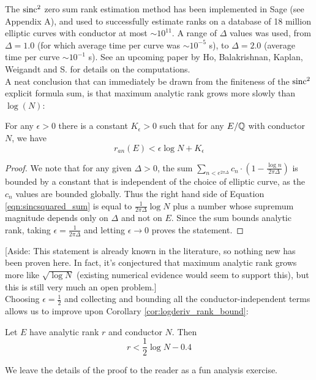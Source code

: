 The $\text{sinc}^2$ zero sum rank estimation method has been implemented in Sage (see Appendix A), and used to successfully estimate ranks on a database of 18 million elliptic curves with conductor at most $\sim 10^{11}$. A range of $\Delta$ values was used, from $\Delta=1.0$ (for which average time per curve was $\sim 10^{-5}$ s), to $\Delta=2.0$ (average time per curve $\sim 10^{-1}$ s). See an upcoming paper by Ho, Balakrishnan, Kaplan, Weigandt and S. for details on the computations. \\

A neat conclusion that can immediately be drawn from the finiteness of the $\text{sinc}^2$ explicit formula sum, is that maximum analytic rank grows more slowly than $\log(N)$:

\begin{corollary}\label{cor:rank_slower_than_log_N}
For any $\epsilon >0$ there is a constant $K_{\epsilon}>0$ such that for any $E/\mathbb{Q}$ with conductor $N$, we have
\begin{equation}
r_{an}(E) < \epsilon \log N + K_{\epsilon}
\end{equation}
\end{corollary}
\begin{proof}
We note that for any given $\Delta>0$, the sum $ \sum_{n<e^{2\pi \Delta}} c_n \cdot \left(1-\frac{\log n}{2\pi \Delta}\right)$ is bounded by a constant that is independent of the choice of elliptic curve, as the $c_n$ values are bounded globally. Thus the right hand side of Equation \ref{eqn:sincsquared_sum} is equal to $\frac{1}{2\pi \Delta}\log N$ plus a number whose supremum magnitude depends only on $\Delta$ and not on $E$. Since the sum bounds analytic rank, taking $\epsilon = \frac{1}{2\pi \Delta}$ and letting $\epsilon \to 0$ proves the statement.
\end{proof}

[Aside: This statement is already known in the literature, so nothing new has been proven here. In fact, it's conjectured that maximum analytic rank grows more like $\sqrt{\log N}$ (existing numerical evidence would seem to support this), but this is still very much an open problem.] \\

Choosing $\epsilon =\frac{1}{2}$ and collecting and bounding all the conductor-independent terms allows us to improve upon Corollary \ref{cor:logderiv_rank_bound}:
\begin{corollary}\label{cor:better_an_bound}
Let $E$ have analytic rank $r$ and conductor $N$. Then
\begin{equation}
r < \frac{1}{2} \log N - 0.4
\end{equation}
\end{corollary}
We leave the details of the proof to the reader as a fun analysis exercise.\\

